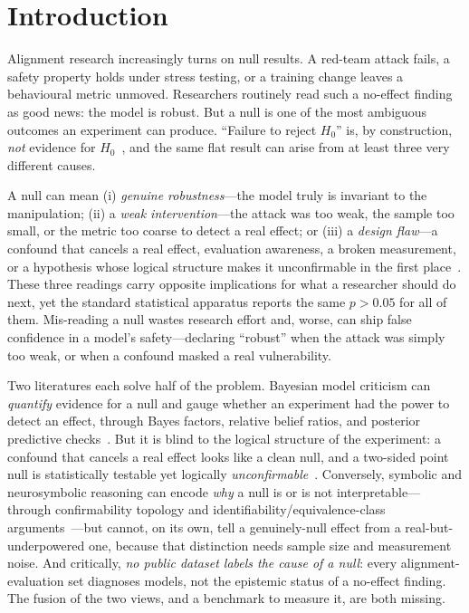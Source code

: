 \section{Introduction}
\label{sec:intro}

Alignment research increasingly turns on null results. A red-team attack fails,
a safety property holds under stress testing, or a training change leaves a
behavioural metric unmoved. Researchers routinely read such a no-effect finding
as good news: the model is robust. But a null is one of the most ambiguous
outcomes an experiment can produce. ``Failure to reject $H_0$'' is, by
construction, \emph{not} evidence for $H_0$~\citep{dale2024confirming}, and the
same flat result can arise from at least three very different causes.

 A null can mean (i) \emph{genuine robustness}---the
model truly is invariant to the manipulation; (ii) a \emph{weak intervention}---the
attack was too weak, the sample too small, or the metric too coarse to detect a
real effect; or (iii) a \emph{design flaw}---a confound that cancels a real
effect, evaluation awareness, a broken measurement, or a hypothesis whose logical
structure makes it unconfirmable in the first place~\citep{dale2024confirming,
santosgrueiro2026limits}. These three readings carry opposite implications for
what a researcher should do next, yet the standard statistical apparatus reports
the same $p > 0.05$ for all of them. Mis-reading a null wastes research effort
and, worse, can ship false confidence in a model's safety---declaring ``robust''
when the attack was simply too weak, or when a confound masked a real
vulnerability.

 Two literatures each solve half of the
problem. Bayesian model criticism can \emph{quantify} evidence for a null and
gauge whether an experiment had the power to detect an effect, through Bayes
factors, relative belief ratios, and posterior predictive
checks~\citep{rouder2009bayesian, moran2022ppn, robert2016demise}. But it is
blind to the logical structure of the experiment: a confound that cancels a real
effect looks like a clean null, and a two-sided point null is statistically
testable yet logically \emph{unconfirmable}~\citep{dale2024confirming}.
Conversely, symbolic and neurosymbolic reasoning can encode \emph{why} a null is
or is not interpretable---through confirmability topology and
identifiability/equivalence-class arguments~\citep{dale2024confirming,
santosgrueiro2026limits, tran2025neurosymbolic}---but cannot, on its own, tell a
genuinely-null effect from a real-but-underpowered one, because that distinction
needs sample size and measurement noise. And critically, \emph{no public dataset
labels the cause of a null}: every alignment-evaluation set diagnoses models, not
the epistemic status of a no-effect finding. The fusion of the two views, and a
benchmark to measure it, are both missing.

